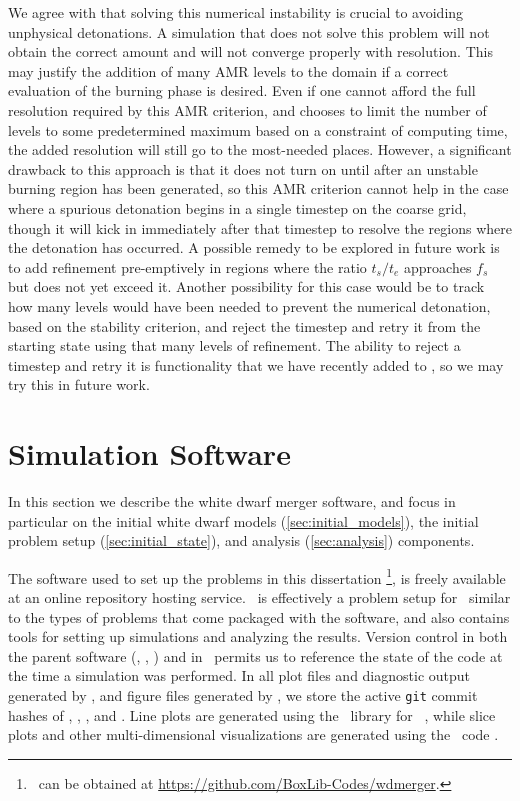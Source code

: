 \documentclass[12pt]{article}
\begin{document}
We agree with \citet{kushnir:2013} that solving this numerical
instability is crucial to avoiding unphysical detonations.
A simulation that does not solve this problem will not obtain
the correct amount and will not converge properly with resolution.
This may justify the addition of many AMR levels to the domain
if a correct evaluation of the burning phase is desired.
Even if one cannot afford the full resolution required by this
AMR criterion, and chooses to limit the number of levels to some
predetermined maximum based on a constraint of computing time,
the added resolution will still go to the most-needed places.
However, a significant drawback to this approach is that it
does not turn on until after an unstable burning region has
been generated, so this AMR criterion cannot help in the case
where a spurious detonation begins in a single timestep on the coarse
grid, though it will kick in immediately after that timestep
to resolve the regions where the detonation has occurred.
A possible remedy to be explored in future work is to add
refinement pre-emptively in regions where the ratio $t_s / t_e$
approaches $f_{s}$ but does not yet exceed it. Another
possibility for this case would be to track how many levels
would have been needed to prevent the numerical detonation,
based on the stability criterion, and reject the timestep and
retry it from the starting state using that many levels of refinement.
The ability to reject a timestep and retry it is functionality that
we have recently added to \castro, so we may try this in future work.



\newpage
\section{Simulation Software}
\label{sec:software}

In this section we describe the white dwarf merger software, and focus in 
particular on the initial white dwarf models (\autoref{sec:initial_models}), 
the initial problem setup (\autoref{sec:initial_state}), and analysis 
(\autoref{sec:analysis}) components.

The software used to set up the problems in this dissertation
\wdmerger\footnote{\wdmerger\ can be obtained at \url{https://github.com/BoxLib-Codes/wdmerger}.},
is freely available at an online repository hosting service.
\wdmerger\ is effectively a problem setup for \castro\ similar to the types of
problems that come packaged with the software, and also contains tools for setting up
simulations and analyzing the results.
Version control in both the parent software (\boxlib, \castro, \microphysics) and in \wdmerger\
permits us to reference the state of the code at the time a simulation
was performed. In all plot files and diagnostic output generated by \castro, 
and figure files generated by \wdmerger,
we store the active \texttt{git} commit hashes of \boxlib, \castro, \microphysics, and \wdmerger.
Line plots are generated using the \matplotlib\ library for \python\ 
\citep{matplotlib}, while slice plots and other multi-dimensional visualizations are 
generated using the \yt\ code \citep{yt}.
\end{document}
